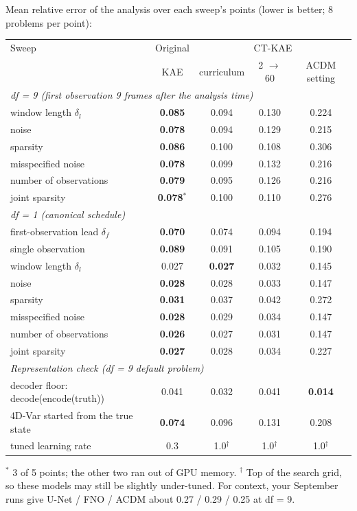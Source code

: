 Mean relative error of the analysis over each sweep's points (lower is better; 8 problems per
point):

\begin{center}\footnotesize
\begin{tabular}{lcccc}
\toprule
Sweep & Original & \multicolumn{3}{c}{CT-KAE}\\
 & KAE & curriculum & 2 $\to$ 60 & ACDM setting\\
\midrule
\multicolumn{5}{l}{\emph{df = 9 (first observation 9 frames after the analysis time)}}\\
window length $\delta_l$ & \textbf{0.085} & 0.094 & 0.130 & 0.224\\
noise                    & \textbf{0.078} & 0.094 & 0.129 & 0.215\\
sparsity                 & \textbf{0.086} & 0.100 & 0.108 & 0.306\\
misspecified noise       & \textbf{0.078} & 0.099 & 0.132 & 0.216\\
number of observations   & \textbf{0.079} & 0.095 & 0.126 & 0.216\\
joint sparsity           & \textbf{0.078}$^\ast$ & 0.100 & 0.110 & 0.276\\
\midrule
\multicolumn{5}{l}{\emph{df = 1 (canonical schedule)}}\\
first-observation lead $\delta_f$ & \textbf{0.070} & 0.074 & 0.094 & 0.194\\
single observation       & \textbf{0.089} & 0.091 & 0.105 & 0.190\\
window length $\delta_l$ & 0.027 & \textbf{0.027} & 0.032 & 0.145\\
noise                    & \textbf{0.028} & 0.028 & 0.033 & 0.147\\
sparsity                 & \textbf{0.031} & 0.037 & 0.042 & 0.272\\
misspecified noise       & \textbf{0.028} & 0.029 & 0.034 & 0.147\\
number of observations   & \textbf{0.026} & 0.027 & 0.031 & 0.147\\
joint sparsity           & \textbf{0.027} & 0.028 & 0.034 & 0.227\\
\midrule
\multicolumn{5}{l}{\emph{Representation check (df = 9 default problem)}}\\
decoder floor: decode(encode(truth)) & 0.041 & 0.032 & 0.041 & \textbf{0.014}\\
4D-Var started from the true state   & \textbf{0.074} & 0.096 & 0.131 & 0.208\\
tuned learning rate                  & 0.3 & 1.0$^\dagger$ & 1.0$^\dagger$ & 1.0$^\dagger$\\
\bottomrule
\end{tabular}
\end{center}
{\footnotesize $^\ast$ 3 of 5 points; the other two ran out of GPU memory.
$^\dagger$ Top of the search grid, so these models may still be slightly under-tuned.
For context, your September runs give U-Net / FNO / ACDM about 0.27 / 0.29 / 0.25 at df = 9.}

